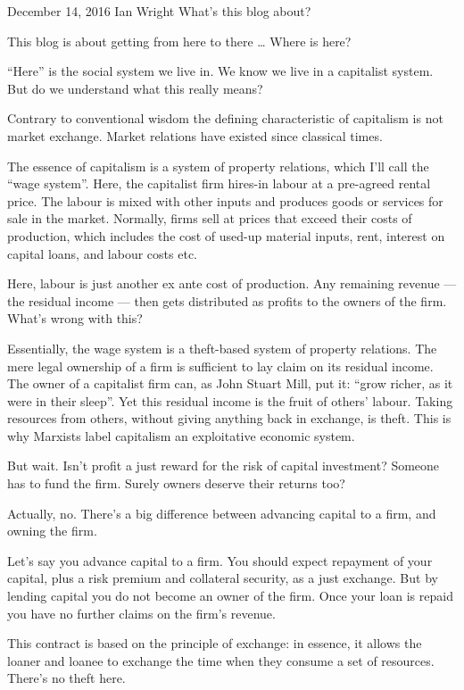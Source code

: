 \documentclass[
]{book}
\begin{document}
December 14, 2016 Ian Wright
What's this blog about?

This blog is about getting from here to there \ldots{}
Where is here?

``Here'' is the social system we live in. We know we live in a capitalist system. But do we understand what this really means?

Contrary to conventional wisdom the defining characteristic of capitalism is not market exchange. Market relations have existed since classical times.

The essence of capitalism is a system of property relations, which I'll call the ``wage system''. Here, the capitalist firm hires-in labour at a pre-agreed rental price. The labour is mixed with other inputs and produces goods or services for sale in the market. Normally, firms sell at prices that exceed their costs of production, which includes the cost of used-up material inputs, rent, interest on capital loans, and labour costs etc.

Here, labour is just another ex ante cost of production. Any remaining revenue --- the residual income --- then gets distributed as profits to the owners of the firm.
What's wrong with this?

Essentially, the wage system is a theft-based system of property relations. The mere legal ownership of a firm is sufficient to lay claim on its residual income. The owner of a capitalist firm can, as John Stuart Mill, put it: ``grow richer, as it were in their sleep''. Yet this residual income is the fruit of others' labour. Taking resources from others, without giving anything back in exchange, is theft. This is why Marxists label capitalism an exploitative economic system.

But wait. Isn't profit a just reward for the risk of capital investment? Someone has to fund the firm. Surely owners deserve their returns too?

Actually, no. There's a big difference between advancing capital to a firm, and owning the firm.

Let's say you advance capital to a firm. You should expect repayment of your capital, plus a risk premium and collateral security, as a just exchange. But by lending capital you do not become an owner of the firm. Once your loan is repaid you have no further claims on the firm's revenue.

This contract is based on the principle of exchange: in essence, it allows the loaner and loanee to exchange the time when they consume a set of resources. There's no theft here.
\end{document}
